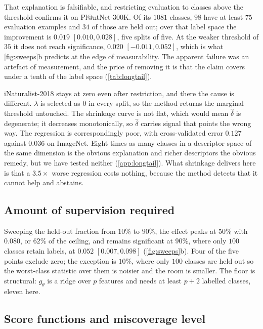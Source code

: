 That explanation is falsifiable, and restricting evaluation to classes above the threshold
confirms it on Pl@ntNet-300K. Of its $1081$ classes, $98$ have at least $75$ evaluation
examples and $34$ of those are held out; over that label space the improvement is $0.019$
$[0.010,0.028]$, five splits of five. At the weaker threshold of $35$ it does not reach
significance, $0.020$ $[-0.011,0.052]$, which is what \cref{fig:sweeps}b predicts at the edge
of measurability. The apparent failure was an artefact of measurement, and the price of
removing it is that the claim covers under a tenth of the label space (\cref{tab:longtail}).

iNaturalist-2018 stays at zero even after restriction, and there the cause is different.
$\lambda$ is selected as $0$ in every split, so the method returns the marginal threshold
untouched. The shrinkage curve is not flat, which would mean $\hat\delta$ is degenerate; it
decreases monotonically, so $\hat\delta$ carries signal that points the wrong way. The
regression is correspondingly poor, with cross-validated error $0.127$ against $0.036$ on
ImageNet. Eight times as many classes in a descriptor space of the same dimension is the
obvious explanation and richer descriptors the obvious remedy, but we have tested neither
(\cref{app:longtail}). What shrinkage delivers here is that a $3.5\times$ worse regression
costs nothing, because the method detects that it cannot help and abstains.


\subsection{Amount of supervision required}
\label{sec:supervision}

Sweeping the held-out fraction from $10\%$ to $90\%$, the effect peaks at $50\%$ with $0.080$,
or $62\%$ of the ceiling, and remains significant at $90\%$, where only $100$ classes retain
labels, at $0.052$ $[0.007,0.098]$ (\cref{fig:sweeps}b). Four of the five points exclude zero;
the exception is $10\%$, where only $100$ classes are held out so the worst-class statistic
over them is noisier and the room is smaller. The floor is structural: $g_\theta$ is a ridge
over $p$ features and needs at least $p+2$ labelled classes, eleven here.

\subsection{Score functions and miscoverage level}
\label{sec:scores}

